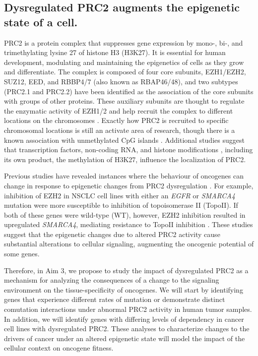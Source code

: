 \subsection*{Dysregulated PRC2 augments the epigenetic state of a cell.}

PRC2 is a protein complex that suppresses gene expression by mono-, bi-, and trimethylating lysine 27 of histone H3 (H3K27).
It is essential for human development, modulating and maintaining the epigenetics of cells as they grow and differentiate.
The complex is composed of four core subunits, EZH1/EZH2, SUZ12, EED, and RBBP4/7 (also known as RBAP46/48), and two subtypes (PRC2.1 and  PRC2.2) have been identified as the association of the core subunits with groups of other proteins.
These auxiliary subunits are thought to regulate the enzymatic activity of EZH1/2 and help recruit the complex to different locations on the chromosomes \cite{VanMierlo2019a, Laugesen2019a}.
Exactly how PRC2 is recruited to specific chromosomal locations is still an activate area of research, though there is a known association with unmethylated CpG islands  \cite{Ku2008, Tanay2007HyperconservedSites., Mendenhall2010GC-richCells., Lynch2012AnRecruitment.}.
Additional studies suggest that transcription factors, non-coding RNA, and histone modifications \cite{Laugesen2019a}, including its own product, the methylation of H3K27, influence the localization of PRC2.

Previous studies have revealed instances where the behaviour of oncogenes can change in response to epigenetic changes from PRC2 dysregulation \cite{Kim2015SWI/SNF-mutantEZH2., Fillmore2015EZH2Inhibitors., Serresi2016PolycombCancer., Serresi2018Ezh2Vulnerabilities., Chen2018TargetingMedicine.}.
For example, inhibition of EZH2 in NSCLC cell lines with either an \emph{EGFR} or \emph{SMARCA4} mutation were more susceptible to inhibition of topoisomerase II (TopoII).
If both of these genes were wild-type (WT), however, EZH2 inhibition resulted in upregulated \emph{SMARCA4}, mediating resistance to TopoII inhibition \cite{Fillmore2015EZH2Inhibitors.}.
These studies suggest that the epigenetic changes due to altered PRC2 activity cause substantial alterations to cellular signaling, augmenting the oncogenic potential of some genes.

Therefore, in Aim 3, we propose to study the impact of dysregulated PRC2 as a mechanism for analyzing the consequences of a change to the signaling environment on the tissue-specificity of oncogenes.
We will start by identifying genes that experience different rates of mutation or demonstrate distinct comutation interactions under abnormal PRC2 activity in human tumor samples.
In addition, we will identify genes with differing levels of dependency in cancer cell lines with dysregulated PRC2.
These analyses to characterize changes to the drivers of cancer under an altered epigenetic state will model the impact of the cellular context on oncogene fitness.
